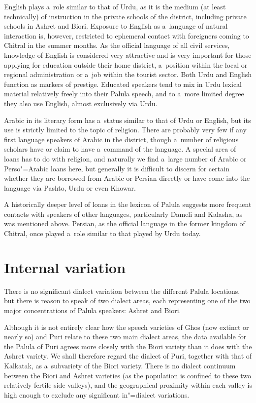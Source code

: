 English plays a~role similar to that of Urdu, as it is the medium (at least technically) of instruction in the private schools of the district, including private schools in Ashret and Biori. Exposure to English as a~language of natural interaction is, however, restricted to ephemeral contact with foreigners coming to Chitral in the summer months. As the official language of all civil services, knowledge of English is considered very attractive and is very important for those applying for education outside their home district, a~position within the local or regional administration or a~job within the tourist sector. Both Urdu and English function as markers of prestige. Educated speakers tend to mix in Urdu lexical material relatively freely into their Palula speech, and to a~more limited degree they also use English, almost exclusively via Urdu. 


Arabic in its literary form has a~status similar to that of Urdu or English, but its use is strictly limited to the topic of religion. There are probably very few if any first language speakers of Arabic in the district, though a~number of religious scholars have or claim to have a~command of the language. A special area of loans has to do with religion, and naturally we find a~large number of Arabic or Perso"=Arabic loans here, but generally it is difficult to discern for certain whether they are borrowed from Arabic or Persian directly or have come into the language via Pashto, Urdu or even Khowar.


A historically deeper level of loans in the lexicon of Palula suggests more frequent contacts with speakers of other languages, particularly Dameli and Kalasha, as was mentioned above. Persian, as the official language in the former kingdom of Chitral, once played a~role similar to that played by Urdu today. 


\section{Internal variation}
\label{sec:1-4}

There is no significant dialect variation between the different Palula locations, but there is reason to speak of two dialect areas, each representing one of the two major concentrations of Palula speakers: Ashret and Biori. 


Although it is not entirely clear how the speech varieties of Ghos (now extinct or nearly so) and Puri relate to these two main dialect areas, the data available for the Palula of Puri agrees more closely with the Biori variety than it does with the Ashret variety. We shall therefore regard the dialect of Puri, together with that of Kalkatak, as a~subvariety of the Biori variety. There is no dialect continuum between the Biori and Ashret varieties (as the population is confined to these two relatively fertile side valleys), and the geographical proximity within each valley is high enough to exclude any significant in"=dialect variations. 


